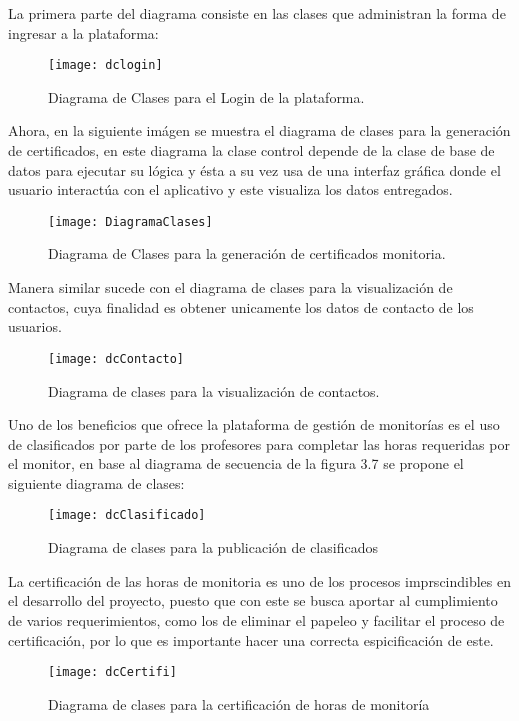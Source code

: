 La primera parte del diagrama consiste en las clases que administran la forma de ingresar a la plataforma:
\begin{figure}[H]
	\centering
	\texttt{[image: dclogin]}
    \centering
    \caption{Diagrama de Clases para el Login de la plataforma.}
	\label{fig:dClaLogin}
\end{figure}

\newpage
Ahora, en la siguiente imágen se muestra el diagrama de clases para la generación de certificados, en este diagrama la clase control depende de la clase de base de datos para ejecutar su lógica y ésta a su vez usa de una interfaz gráfica donde el usuario interactúa con el aplicativo y este visualiza los datos entregados.

\begin{figure}[H]
	\centering
	\texttt{[image: DiagramaClases]}
    \centering
    \caption{Diagrama de Clases para la generación de certificados monitoria.}
	\label{fig:dClaCertificado}
\end{figure}

\newpage
Manera similar sucede con el diagrama de clases para la visualización de contactos, cuya finalidad es obtener unicamente los datos de contacto de los usuarios.
\begin{figure}[H]
	\centering
	\texttt{[image: dcContacto]}
    \centering
    \caption{Diagrama de clases para la visualización de contactos.}
	\label{fig:dClaContacto}
\end{figure}
\newpage
\clearpage
Uno de los beneficios que ofrece la plataforma de gestión de monitorías es el uso de clasificados por parte de los profesores para completar las horas requeridas por el monitor, en base al diagrama de secuencia de la figura 3.7 se propone el siguiente diagrama de clases:

\begin{figure}[H]
	\centering
	\texttt{[image: dcClasificado]}
    \centering
    \caption{Diagrama de clases para la publicación de clasificados}
	\label{fig:dClaClasificado}
\end{figure}
\clearpage
La certificación de las horas de monitoria es uno de los procesos imprscindibles en el desarrollo del proyecto, puesto que con este se busca aportar al cumplimiento de varios requerimientos, como los de eliminar el papeleo y facilitar el proceso de certificación, por lo que es importante hacer una correcta espicificación de este.
\begin{figure}[H]
	\centering
	\texttt{[image: dcCertifi]}
    \centering
    \caption{Diagrama de clases para la certificación de horas de monitoría}
	\label{fig:dClaCertifi}
\end{figure}


